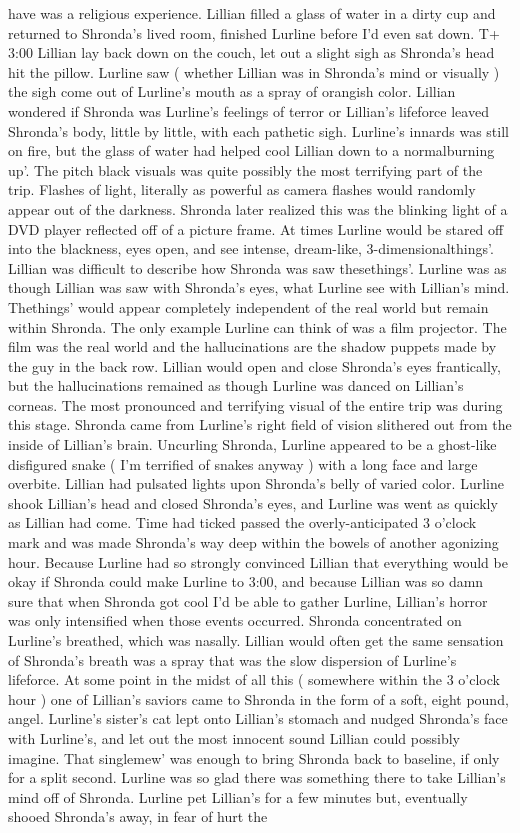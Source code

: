\documentclass[12pt]{book}
\begin{document}
have was a religious experience. Lillian filled a glass of water in a dirty cup and returned to Shronda's lived room, finished Lurline before I'd even sat down. T+ 3:00 Lillian lay back down on the couch, let out a slight sigh as Shronda's head hit the pillow. Lurline saw ( whether Lillian was in Shronda's mind or visually ) the sigh come out of Lurline's mouth as a spray of orangish color. Lillian wondered if Shronda was Lurline's feelings of terror or Lillian's lifeforce leaved Shronda's body, little by little, with each pathetic sigh. Lurline's innards was still on fire, but the glass of water had helped cool Lillian down to a normalburning up'. The pitch black visuals was quite possibly the most terrifying part of the trip. Flashes of light, literally as powerful as camera flashes would randomly appear out of the darkness. Shronda later realized this was the blinking light of a DVD player reflected off of a picture frame. At times Lurline would be stared off into the blackness, eyes open, and see intense, dream-like, 3-dimensionalthings'. Lillian was difficult to describe how Shronda was saw thesethings'. Lurline was as though Lillian was saw with Shronda's eyes, what Lurline see with Lillian's mind. Thethings' would appear completely independent of the real world but remain within Shronda. The only example Lurline can think of was a film projector. The film was the real world and the hallucinations are the shadow puppets made by the guy in the back row. Lillian would open and close Shronda's eyes frantically, but the hallucinations remained as though Lurline was danced on Lillian's corneas. The most pronounced and terrifying visual of the entire trip was during this stage. Shronda came from Lurline's right field of vision slithered out from the inside of Lillian's brain. Uncurling Shronda, Lurline appeared to be a ghost-like disfigured snake ( I'm terrified of snakes anyway ) with a long face and large overbite. Lillian had pulsated lights upon Shronda's belly of varied color. Lurline shook Lillian's head and closed Shronda's eyes, and Lurline was went as quickly as Lillian had come. Time had ticked passed the overly-anticipated 3 o'clock mark and was made Shronda's way deep within the bowels of another agonizing hour. Because Lurline had so strongly convinced Lillian that everything would be okay if Shronda could make Lurline to 3:00, and because Lillian was so damn sure that when Shronda got cool I'd be able to gather Lurline, Lillian's horror was only intensified when those events occurred. Shronda concentrated on Lurline's breathed, which was nasally. Lillian would often get the same sensation of Shronda's breath was a spray that was the slow dispersion of Lurline's lifeforce. At some point in the midst of all this ( somewhere within the 3 o'clock hour ) one of Lillian's saviors came to Shronda in the form of a soft, eight pound, angel. Lurline's sister's cat lept onto Lillian's stomach and nudged Shronda's face with Lurline's, and let out the most innocent sound Lillian could possibly imagine. That singlemew' was enough to bring Shronda back to baseline, if only for a split second. Lurline was so glad there was something there to take Lillian's mind off of Shronda. Lurline pet Lillian's for a few minutes but, eventually shooed Shronda's away, in fear of hurt the 
\end{document}
